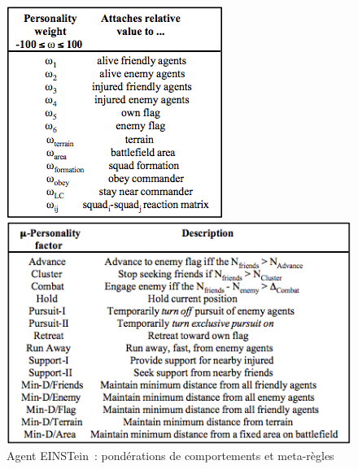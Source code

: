 \documentclass{article}
\begin{document}
\begin{center}
\begin{figure}[H]
\begin{minipage}[H]{0.35\linewidth}
	\centering
	\includegraphics[width=\textwidth]{../ressources/einstein_personality_weight}
\end{minipage}
\hfill
\begin{minipage}[H]{0.55\linewidth}
	\centering
	\includegraphics[width=\textwidth]{../ressources/einstein_personality_factor}
\end{minipage}
\caption{Agent EINSTein~: pondérations de comportements et meta-règles}
\end{figure}
\end{center}
\end{document}
